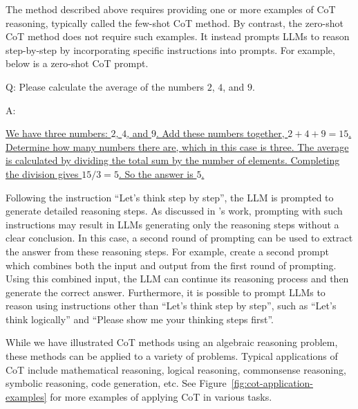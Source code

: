 The method described above requires providing one or more examples of CoT reasoning, typically called the few-shot CoT method. By contrast, the zero-shot CoT method does not require such examples. It instead prompts LLMs to reason step-by-step by incorporating specific instructions into prompts. For example, below is a zero-shot CoT prompt.

\vspace{0.5em}
\begin{tcolorbox}

\begingroup
\setlength{\leftskip}{2em}
\setlength{\rightskip}{2em}

Q: Please calculate the average of the numbers $2$, $4$, and $9$.

\vspace{0.3em}

A: 

\vspace{0.3em}

\uline{We have three numbers: $2$, $4$, and $9$. Add these numbers together, $2+4+9=15$. Determine how many numbers there are, which in this case is three. The average is calculated by dividing the total sum by the number of elements. Completing the division gives $15/3 = 5$. So the answer is $5$.}

\endgroup

\end{tcolorbox}
\vspace{0.5em}

Following the instruction ``Let's think step by step'', the LLM is prompted to generate detailed reasoning steps. As discussed in \citet{kojima-etal:2022large}'s work, prompting with such instructions may result in LLMs generating only the reasoning steps without a clear conclusion. In this case, a second round of prompting can be used to extract the answer from these reasoning steps. For example, \citet{kojima-etal:2022large} create a second prompt which combines both the input and output from the first round of prompting. Using this combined input, the LLM can continue its reasoning process and then generate the correct answer. Furthermore, it is possible to prompt LLMs to reason using instructions other than ``Let's think step by step'', such as ``Let's think logically'' and ``Please show me your thinking steps first''.

While we have illustrated CoT methods using an algebraic reasoning problem, these methods can be applied to a variety of problems. Typical applications of CoT include mathematical reasoning, logical reasoning, commonsense reasoning, symbolic reasoning, code generation, etc. See Figure~\ref{fig:cot-application-examples} for more examples of applying CoT in various tasks.

